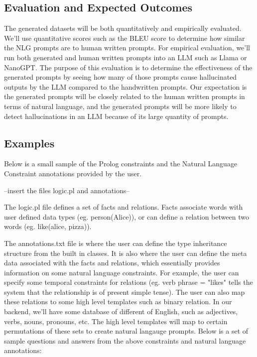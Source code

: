\documentclass{article}
\begin{document}
\subsection{Evaluation and Expected Outcomes}
The generated datasets will be both quantitatively and empirically evaluated.  We’ll use quantitative scores such as the BLEU score to determine how similar the NLG prompts are to human written prompts.  For empirical evaluation, we’ll run both generated and human written prompts into an LLM such as Llama or NanoGPT.  The purpose of this evaluation is to determine the effectiveness of the generated prompts by seeing how many of those prompts cause hallucinated outputs by the LLM compared to the handwritten prompts.  Our expectation is the generated prompts will be closely related to the human written prompts in terms of natural language, and the generated prompts will be more likely to detect hallucinations in an LLM because of its large quantity of prompts.

\subsection{Examples}
Below is a small sample of the Prolog constraints and the Natural Language Constraint annotations provided by the user.


--insert the files logic.pl and annotations--

The logic.pl file defines a set of facts and relations.  Facts associate words with user defined data types (eg. person(Alice)), or can define
a relation between two words (eg. like(alice, pizza)).


The annotations.txt file is where the user can define the type inheritance structure from the built in classes.  It is also where the user can define the meta data associated with the
facts and relations, which essentially provides information on some natural language constraints.  For example, the user can specify some temporal constraints for relations (eg. verb phrase = "likes" tells the system that the relationship is of present simple tense).
The user can also map these relations to some high level templates such as binary relation.  In our backend, we'll have some database of different of English, such as adjectives, verbs, nouns, pronouns, etc.  The high level templates will map to certain permutations of these sets to create natural langauge 
prompts.  Below is a set of sample questions and answers from the above constraints and natural language annotations:
\end{document}
